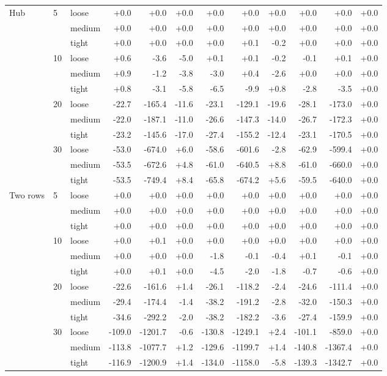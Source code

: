 \begin{table}[htbp]
\begin{tabular}{lll *{9}{r}}
    Hub & 5 & loose & +0.0 & +0.0 & +0.0 & +0.0 & +0.0 & +0.0 & +0.0 & +0.0 & +0.0 \\
     &  & medium & +0.0 & +0.0 & +0.0 & +0.0 & +0.0 & +0.0 & +0.0 & +0.0 & +0.0 \\
     &  & tight & +0.0 & +0.0 & +0.0 & +0.0 & +0.1 & -0.2 & +0.0 & +0.0 & +0.0 \\
     & 10 & loose & +0.6 & -3.6 & -5.0 & +0.1 & +0.1 & -0.2 & -0.1 & +0.1 & +0.0 \\
     &  & medium & +0.9 & -1.2 & -3.8 & -3.0 & +0.4 & -2.6 & +0.0 & +0.0 & +0.0 \\
     &  & tight & +0.8 & -3.1 & -5.8 & -6.5 & -9.9 & +0.8 & -2.8 & -3.5 & +0.0 \\
     & 20 & loose & -22.7 & -165.4 & -11.6 & -23.1 & -129.1 & -19.6 & -28.1 & -173.0 & +0.0 \\
     &  & medium & -22.0 & -187.1 & -11.0 & -26.6 & -147.3 & -14.0 & -26.7 & -172.3 & +0.0 \\
     &  & tight & -23.2 & -145.6 & -17.0 & -27.4 & -155.2 & -12.4 & -23.1 & -170.5 & +0.0 \\
     & 30 & loose & -53.0 & -674.0 & +6.0 & -58.6 & -601.6 & -2.8 & -62.9 & -599.4 & +0.0 \\
     &  & medium & -53.5 & -672.6 & +4.8 & -61.0 & -640.5 & +8.8 & -61.0 & -660.0 & +0.0 \\
     &  & tight & -53.5 & -749.4 & +8.4 & -65.8 & -674.2 & +5.6 & -59.5 & -640.0 & +0.0 \\
    Two rows & 5 & loose & +0.0 & +0.0 & +0.0 & +0.0 & +0.0 & +0.0 & +0.0 & +0.0 & +0.0 \\
     &  & medium & +0.0 & +0.0 & +0.0 & +0.0 & +0.0 & +0.0 & +0.0 & +0.0 & +0.0 \\
     &  & tight & +0.0 & +0.0 & +0.0 & +0.0 & +0.0 & +0.0 & +0.0 & +0.0 & +0.0 \\
     & 10 & loose & +0.0 & +0.1 & +0.0 & +0.0 & +0.0 & +0.0 & +0.0 & +0.0 & +0.0 \\
     &  & medium & +0.0 & +0.0 & +0.0 & -1.8 & -0.1 & -0.4 & +0.1 & -0.1 & +0.0 \\
     &  & tight & +0.0 & +0.1 & +0.0 & -4.5 & -2.0 & -1.8 & -0.7 & -0.6 & +0.0 \\
     & 20 & loose & -22.6 & -161.6 & +1.4 & -26.1 & -118.2 & -2.4 & -24.6 & -111.4 & +0.0 \\
     &  & medium & -29.4 & -174.4 & -1.4 & -38.2 & -191.2 & -2.8 & -32.0 & -150.3 & +0.0 \\
     &  & tight & -34.6 & -292.2 & -2.0 & -38.2 & -182.2 & -3.6 & -27.4 & -159.9 & +0.0 \\
     & 30 & loose & -109.0 & -1201.7 & -0.6 & -130.8 & -1249.1 & +2.4 & -101.1 & -859.0 & +0.0 \\
     &  & medium & -113.8 & -1077.7 & +1.2 & -129.6 & -1199.7 & +1.4 & -140.8 & -1367.4 & +0.0 \\
     &  & tight & -116.9 & -1200.9 & +1.4 & -134.0 & -1158.0 & -5.8 & -139.3 & -1342.7 & +0.0 \\
    \bottomrule
  \end{tabular}
\end{table}
